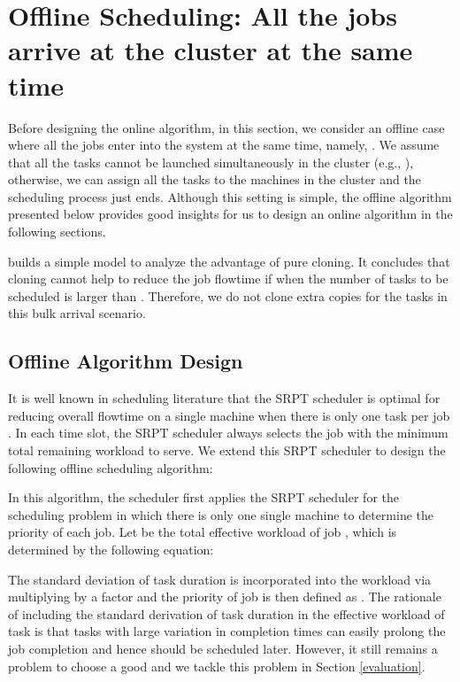 \documentclass[10pt,conference,compsocconf,letterpaper]{IEEEtran}
\begin{document}
\section{Offline Scheduling: All the jobs arrive at the cluster at the same time}
\label{bulk_arrival}
Before designing the online algorithm, in this section, we consider an offline case where all the jobs enter into the system at the same time, namely, .
We assume that all the tasks cannot be launched simultaneously in the cluster (e.g., ), otherwise, we can assign all the tasks to the machines in the cluster and the scheduling process just ends. Although this setting is simple, the offline algorithm presented below provides good insights for us to design an online algorithm in the following sections.

\cite{grass} builds a simple model to analyze the advantage of pure cloning. It concludes that cloning cannot help to reduce the job flowtime if  when the number of tasks to be scheduled is larger than . Therefore, we do not clone extra copies for the tasks in this bulk arrival scenario.







\subsection{Offline Algorithm Design}
It is well known in scheduling literature that the SRPT scheduler is optimal for reducing overall flowtime on a single machine when there is only one task per job \cite{Scheduling_book}. In each time slot, the SRPT scheduler always selects the job with the minimum total remaining workload to serve.  We extend this SRPT scheduler to design the following offline scheduling algorithm:

In this algorithm, the scheduler first applies the SRPT scheduler for the scheduling problem in which there is only one single machine to determine the priority of each job.
Let  be the total effective workload of job , which is determined by the following equation:

The standard deviation of task duration is incorporated into the workload via multiplying by a factor  and the priority of job  is then defined as . The rationale of including the standard derivation of task duration in the effective workload of task is that tasks with large variation in completion times can easily prolong the job completion and hence should be scheduled later. However, it still
remains a problem to choose a good  and we tackle this problem in Section \ref{evaluation}.
\end{document}
